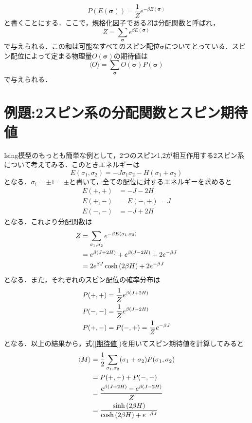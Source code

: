 \documentclass[a4paper,11pt]{jsarticle}
\begin{document}
\begin{equation}
  P(E(\bm{\sigma})) = \frac{1}{Z}e^{-\beta E(\bm{\sigma})}
\end{equation}
と書くことにする．ここで，規格化因子である$Z$は分配関数と呼ばれ，
\begin{equation}
  Z = \sum_{\bm{\sigma}} e^{\beta E(\bm{\sigma})}
\end{equation}
で与えられる．この和は可能なすべてのスピン配位$\bm{\sigma}$についてとっている．スピン配位によって定まる物理量$O(\bm{\sigma})$の期待値は
\begin{equation}
  \langle O \rangle = \sum_{\bm{\sigma}}O(\bm{\sigma}) P(\bm{\sigma}) \label{期待値}
\end{equation}
で与えられる．\par

\section*{例題:2スピン系の分配関数とスピン期待値}
Ising模型のもっとも簡単な例として，2つのスピン1,2が相互作用する2スピン系について考えてみる．このときエネルギーは
\begin{equation}
  E(\sigma_1, \sigma_2) = -J\sigma_1 \sigma_2 -H(\sigma_1 + \sigma_2)
\end{equation}
となる．$\sigma_i = \pm 1 = \pm$と書いて，全ての配位に対するエネルギーを求めると
\begin{align}
  E(+,+) &= -J -2H \\
  E(+,-) &= E(-,+) = J \\
  E(-,-) &= -J +2H
\end{align}
となる．これより分配関数は
\begin{align}
  Z 
  &= \sum_{\sigma_1,\sigma_2} e^{-\beta E(\sigma_1, \sigma_2)} \notag \\
  &= e^{\beta(J+2H)} + e^{\beta(J-2H)} + 2e^{-\beta J} \notag \\
  &= 2e^{\beta J}\cosh{(2\beta H)} + 2e^{-\beta J} \label{eq:分配関数}
\end{align}
となる．また，それぞれのスピン配位の確率分布は
\begin{align}
  P(+,+) &= \frac{1}{Z} e^{\beta(J + 2H)} \notag \\
  P(-,-) &= \frac{1}{Z} e^{\beta(J - 2H)} \notag \\
  P(+,-) &= P(-,+) = \frac{1}{Z} e^{-\beta J} 
\end{align}
となる．以上の結果から，式(\ref{期待値})を用いてスピン期待値を計算してみると
\begin{align}
  \langle M \rangle 
  &= \frac{1}{2}\sum_{\sigma_1,\sigma_2}(\sigma_1 + \sigma_2)P(\sigma_1, \sigma_2) \notag \\
  &= P(+,+) + P(-,-) \notag \\
  &= \frac{e^{\beta(J + 2H)} - e^{\beta(J - 2H)}}{Z} \notag \\
  &= \frac{\sinh{(2\beta H)}}{\cosh{(2\beta H)} + e^{-\beta J}} \label{eq:スピン期待値}
\end{align}
\end{document}
